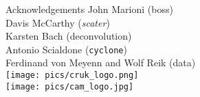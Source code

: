 \documentclass{beamer}
\begin{document}
\begin{frame}{Acknowledgements}
John Marioni (boss) \\
Davis McCarthy (\textit{scater}) \\
Karsten Bach (deconvolution) \\
Antonio Scialdone (\texttt{cyclone}) \\
Ferdinand von Meyenn and Wolf Reik (data) \\[0.2in]
\texttt{[image: pics/cruk\_logo.png]} \\[0.1in]
\texttt{[image: pics/cam\_logo.jpg]} 
\end{frame}
\end{document}
